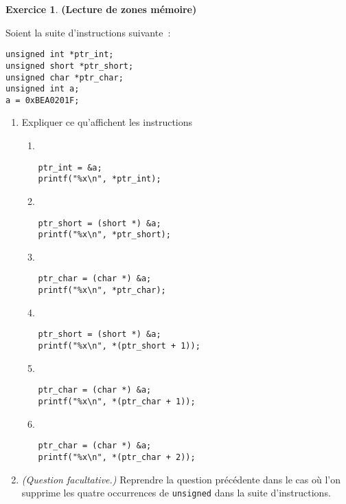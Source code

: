 \documentclass[12pt]{article}
\theoremstyle{definition}
\newtheorem{Exercice}{Exercice}
\begin{document}
\begin{Exercice} {\bf (Lecture de zones mémoire)}\smallskip

Soient la suite d'instructions suivante~:
\begin{lstlisting}
unsigned int *ptr_int;
unsigned short *ptr_short;
unsigned char *ptr_char;
unsigned int a;
a = 0xBEA0201F;
\end{lstlisting}
\begin{enumerate}
    \item Expliquer ce qu'affichent les instructions
    \begin{multicols}{2}
    \begin{enumerate}
        \item ~
\begin{lstlisting}
ptr_int = &a;
printf("%x\n", *ptr_int);
\end{lstlisting}
    \smallskip
    
    \item ~
\begin{lstlisting}
ptr_short = (short *) &a;
printf("%x\n", *ptr_short);
\end{lstlisting}
    \smallskip
    
    \item ~
\begin{lstlisting}
ptr_char = (char *) &a;
printf("%x\n", *ptr_char);
\end{lstlisting}
    \smallskip
    
    \item ~
\begin{lstlisting}
ptr_short = (short *) &a;
printf("%x\n", *(ptr_short + 1));
\end{lstlisting}
    \smallskip
    
    \item ~
\begin{lstlisting}
ptr_char = (char *) &a;
printf("%x\n", *(ptr_char + 1));
\end{lstlisting}
    \smallskip
    
    \item ~
\begin{lstlisting}
ptr_char = (char *) &a;
printf("%x\n", *(ptr_char + 2));
\end{lstlisting}
    \end{enumerate}
    \end{multicols}
    
    \item {\em (Question facultative.)} Reprendre la question 
    précédente dans le cas où l'on supprime les quatre occurrences 
    de {\tt unsigned} dans la suite d'instructions.
\end{enumerate}
\end{Exercice}
\bigskip
\end{document}
